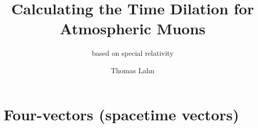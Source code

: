\documentclass[pagesize,headsepline,10pt,parskip=half]{scrreprt}
\begin{document}

  \begin{titlepage}
    \title{Calculating the Time Dilation for Atmospheric Muons}
    \subtitle{based on special relativity}
    \author{Thomas Lahn}
    \maketitle
  \end{titlepage}

  \clearpage
  \begin{spacing}{1}
    \tableofcontents
    \thispagestyle{empty}
  \end{spacing}


  \clearpage
  \chapter{Four-vectors (spacetime vectors)}
\end{document}
